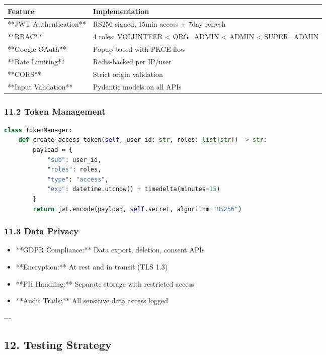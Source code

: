 \documentclass[11pt,a4paper]{article}
\begin{document}
\begin{table}[H]
\centering
\begin{tabular}{|l|l|}
\hline
Feature & Implementation \\
\hline
**JWT Authentication** & RS256 signed, 15min access + 7day refresh \\
\hline
**RBAC** & 4 roles: VOLUNTEER < ORG_ADMIN < ADMIN < SUPER_ADMIN \\
\hline
**Google OAuth** & Popup-based with PKCE flow \\
\hline
**Rate Limiting** & Redis-backed per IP/user \\
\hline
**CORS** & Strict origin validation \\
\hline
**Input Validation** & Pydantic models on all APIs \\
\hline
\end{tabular}
\end{table}

\subsubsection{11.2 Token Management}

\begin{lstlisting}[language=python, caption=python code]
class TokenManager:
    def create_access_token(self, user_id: str, roles: list[str]) -> str:
        payload = {
            "sub": user_id,
            "roles": roles,
            "type": "access",
            "exp": datetime.utcnow() + timedelta(minutes=15)
        }
        return jwt.encode(payload, self.secret, algorithm="HS256")
\end{lstlisting}

\subsubsection{11.3 Data Privacy}

\begin{itemize}
\item **GDPR Compliance:** Data export, deletion, consent APIs
\item **Encryption:** At rest and in transit (TLS 1.3)
\item **PII Handling:** Separate storage with restricted access
\item **Audit Trails:** All sensitive data access logged
\end{itemize}

---

\subsection{12. Testing Strategy}
\end{document}
